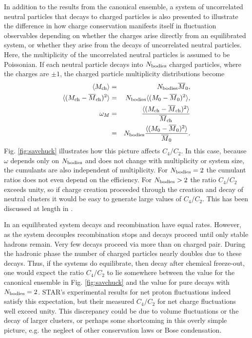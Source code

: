 \documentclass[aps,prc,nofootinbib,showpacs,superscriptaddress,groupedaddress]{revtex4-1}
\begin{document}
In addition to the results from the canonical ensemble, a system of uncorrelated neutral particles that decays to charged particles is also presented to illustrate the difference in how charge conservation manifests itself in fluctuation observables depending on whether the charges arise directly from an equilibrated system, or whether they arise from the decays of uncorrelated neutral particles. Here, the multiplicity of the uncorrelated neutral particles is assumed to be Poissonian. If each neutral particle decays into $N_{\rm bodies}$ charged particles, where the charges are $\pm 1$, the charged particle multiplicity distributions become 
\begin{eqnarray}
\langle M_{\rm ch}\rangle&=&N_{\rm bodies}\overline{M}_0,\\
\nonumber
\langle(M_{\rm ch}-\overline{M}_{\rm ch})^2\rangle&=&N_{\rm bodies}\langle(M_0-\overline{M}_0)^2\rangle,\\
\omega_M&=&\frac{\langle(M_{\rm ch}-\overline{M}_{\rm ch})^2\rangle}{\overline{M}_{\rm ch}}\\
&=&N_{\rm bodies}\frac{\langle(M_0-\overline{M}_0)^2\rangle}{\overline{M}_0}.
\end{eqnarray}
Fig. \ref{fig:savchuck} illustrates how this picture affects $C_4/C_2$. In this case, because $\omega$ depends only on $N_{\rm bodies}$ and does not change with multiplicity or system size, the cumulants are also independent of multiplicity. For $N_{\rm bodies}=2$ the cumulant ratios does not even depend on the efficiency. For $N_{\rm bodies}>2$ the ratio $C_4/C_2$ exceeds unity, so if charge creation proceeded through the creation and decay of neutral clusters it would be easy to generate large values of $C_4/C_2$. This has been discussed at length in \cite{Bzdak:2018uhv}.

In an equilibrated system decays and recombination have equal rates. However, as the system decouples recombination stops and decays proceed until only stable hadrons remain. Very few decays proceed via more than on charged pair. During the hadronic phase the number of charged particles nearly doubles due to these decays. Thus, if the systems do equilibrate, then decay after chemical freeze-out, one would expect the ratio $C_4/C_2$ to lie somewhere between the value for the canonical ensemble in Fig. \ref{fig:savchuck} and the value for pure decays with $N_{\rm bodies}=2$. STAR's experimental results for net proton fluctuations indeed satisfy this expectation, but their measured $C_4/C_2$ for net charge fluctuations well exceed unity. This discrepancy could be due to volume fluctuations or the decay of larger clusters, or perhaps some shortcoming in this overly simple picture, e.g. the neglect of other conservation laws or Bose condensation. 
\end{document}
